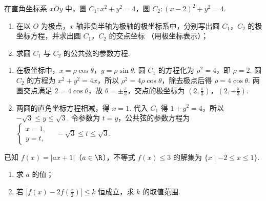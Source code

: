 \begin{problem}
在直角坐标系 \(xOy\) 中，圆 \(C_1: x^2 + y^2 = 4\)，圆 \(C_2: (x - 2)^2 + y^2 = 4\).
\begin{enumerate}
\item 在以 \(O\) 为极点，\(x\) 轴非负半轴为极轴的极坐标系中，分别写出圆 \(C_1\)，\(C_2\) 的极坐标方程，并求出圆 \(C_1\)，\(C_2\) 的交点坐标 （用极坐标表示）；
\item 求圆 \(C_1\) 与 \(C_2\) 的公共弦的参数方程.
\end{enumerate}
\end{problem}

\begin{solution}
\begin{enumerate}
\item 在极坐标中，\(x=\rho\cos\theta\)，\(y=\rho\sin\theta\). 圆 \(C_1\) 的方程化为 \(\rho^2=4\)，即 \(\rho=2\). 圆 \(C_2\) 的方程为 \(x^2+y^2=4x\)，所以 \(\rho^2=4\rho\cos\theta\)，除去极点后得 \(\rho=4\cos\theta\). 两圆交点满足 \(2=4\cos\theta\)，故 \(\theta=\pm\frac{\pi}{3}\)，交点的极坐标为 \(\left(2,\frac{\pi}{3}\right)\)，\(\left(2,-\frac{\pi}{3}\right)\).
\item 两圆的直角坐标方程相减，得 \(x=1\). 代入 \(C_1\) 得 \(1+y^2=4\)，所以 \(-\sqrt{3}\leqslant y\leqslant\sqrt{3}\). 令参数为 \(t=y\)，公共弦的参数方程为
\(\begin{cases}
x=1,\\
y=t,
\end{cases}\quad -\sqrt{3}\leqslant t\leqslant\sqrt{3}.\)
\end{enumerate}
\end{solution}

\begin{problem}
已知 \( f(x) = |ax + 1| \)（\(a \in \R\)），不等式 \( f(x) \leqslant 3 \) 的解集为 \(\{x \mid -2 \leqslant x \leqslant 1\}\).
\begin{enumerate}
\item 求 \(a\) 的值；
\item 若 \(\left|f(x)-2f\left(\frac{x}{2}\right)\right|\leqslant k\) 恒成立，求 \(k\) 的取值范围.
\end{enumerate}
\end{problem}

